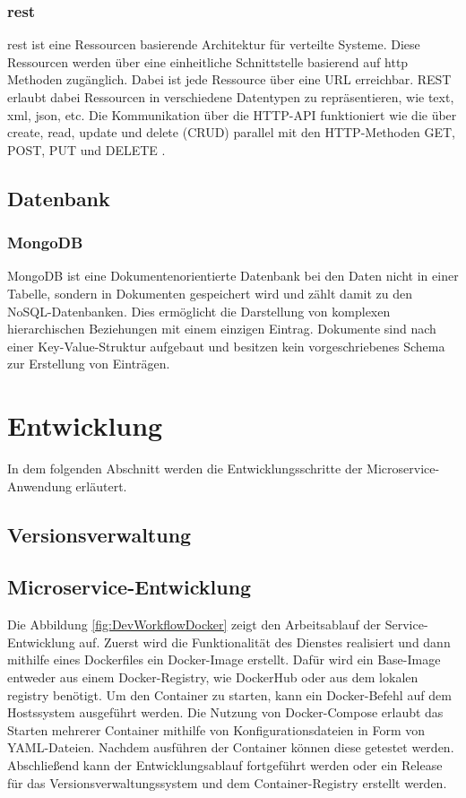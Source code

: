 \subsubsection{\ac{rest}}
\acs{rest} ist eine Ressourcen basierende Architektur für verteilte Systeme.
Diese Ressourcen werden über eine einheitliche Schnittstelle basierend auf 
\acs{http} Methoden zugänglich.
Dabei ist jede Ressource über eine URL erreichbar.
REST erlaubt dabei Ressourcen in verschiedene Datentypen zu repräsentieren, wie text, xml, json, etc.
Die Kommunikation über die HTTP-API funktioniert wie die über create, read, update und delete (CRUD) parallel mit den HTTP-Methoden GET, POST, PUT und DELETE \cite{fundamentalsRestfulAPI}.

\subsection{Datenbank}

\subsubsection{MongoDB}

MongoDB ist eine Dokumentenorientierte Datenbank bei den Daten nicht in einer Tabelle, 
sondern in Dokumenten gespeichert wird und zählt damit zu den NoSQL-Datenbanken.
Dies ermöglicht die Darstellung von komplexen hierarchischen Beziehungen mit einem einzigen Eintrag.
Dokumente sind nach einer Key-Value-Struktur aufgebaut und besitzen kein vorgeschriebenes Schema zur Erstellung von Einträgen.


\section{Entwicklung}
In dem folgenden Abschnitt werden die Entwicklungsschritte der Microservice-Anwendung erläutert.

\subsection{Versionsverwaltung}

\subsection{Microservice-Entwicklung}

Die Abbildung \ref{fig:DevWorkflowDocker} zeigt den Arbeitsablauf der Service-Entwicklung auf.
Zuerst wird die Funktionalität des Dienstes realisiert und dann mithilfe eines Dockerfiles ein Docker-Image erstellt.
Dafür wird ein Base-Image entweder aus einem Docker-Registry, wie DockerHub oder aus dem lokalen registry benötigt.
Um den Container zu starten, kann ein Docker-Befehl auf dem Hostssystem ausgeführt werden.
Die Nutzung von Docker-Compose erlaubt das Starten mehrerer Container mithilfe von Konfigurationsdateien in Form von YAML-Dateien.
Nachdem ausführen der Container können diese getestet werden.
Abschließend kann der Entwicklungsablauf fortgeführt werden oder ein Release für das Versionsverwaltungssystem und dem Container-Registry erstellt werden.


